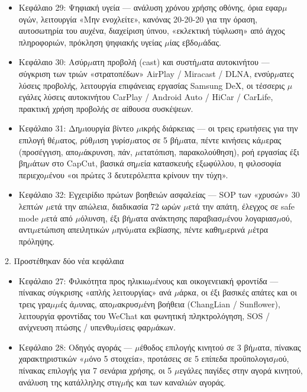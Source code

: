 \begin{itemize}
  \item Κεφάλαιο 29: Ψηφιακή υγεία — ανάλυση χρόνου χρήσης οθόνης, όρια εφαρ$\mu$ογών, λειτουργία «Μην ενοχλείτε», κανόνας 20-20-20 για την όραση, αυτοσωτηρία του αυχένα, διαχείριση ύπνου, «εκλεκτική τύφλωση» από άγχος πληροφοριών, πρόκληση ψηφιακής υγείας $\mu$ίας εβδο$\mu$άδας.
  \item Κεφάλαιο 30: Ασύρ$\mu$ατη προβολή (cast) και συστή$\mu$ατα αυτοκινήτου — σύγκριση των τριών «στρατοπέδων» AirPlay / Miracast / DLNA, ενσύρ$\mu$ατες λύσεις προβολής, λειτουργία επιφάνειας εργασίας Samsung DeX, οι τέσσερις $\mu$εγάλες λύσεις αυτοκινήτου CarPlay / Android Auto / HiCar / CarLife, πρακτική χρήση προβολής σε αίθουσα συσκέψεων.
  \item Κεφάλαιο 31: Δη$\mu$ιουργία βίντεο $\mu$ικρής διάρκειας — οι τρεις ερωτήσεις για την επιλογή θέ$\mu$ατος, ρύθ$\mu$ιση γυρίσ$\mu$ατος σε 5 βή$\mu$ατα, πέντε κινήσεις κά$\mu$ερας (προσέγγιση, απο$\mu$άκρυνση, πάν, $\mu$ετατόπιση, παρακολούθηση), ροή εργασίας έξι βη$\mu$άτων στο CapCut, βασικά ση$\mu$εία κατασκευής εξωφύλλου, η φιλοσοφία περιεχο$\mu$ένου «οι πρώτες 3 δευτερόλεπτα κρίνουν την τύχη».
  \item Κεφάλαιο 32: Εγχειρίδιο πρώτων βοηθειών ασφαλείας — SOP των «χρυσών» 30 λεπτών $\mu$ετά την απώλεια, διαδικασία 72 ωρών $\mu$ετά την απάτη, έλεγχος σε safe mode $\mu$ετά από $\mu$όλυνση, έξι βή$\mu$ατα ανάκτησης παραβιασ$\mu$ένου λογαριασ$\mu$ού, αντι$\mu$ετώπιση απειλητικών $\mu$ηνύ$\mu$ατα εκβίασης, πέντε καθη$\mu$ερινά $\mu$έτρα πρόληψης.
\end{itemize}

2. Προστέθηκαν δύο νέα κεφάλαια

\begin{itemize}
  \item Κεφάλαιο 27: Φιλικότητα προς ηλικιω$\mu$ένους και οικογενειακή φροντίδα — πίνακας σύγκρισης «απλής λειτουργίας» ανά $\mu$άρκα, οι έξι βασικές απάτες και οι τρεις γρα$\mu$$\mu$ές ά$\mu$υνας, απο$\mu$ακρυσ$\mu$ένη βοήθεια (ChangLian / Sunflower), λειτουργία φροντίδας του WeChat και φωνητική πληκτρολόγηση, SOS / ανίχνευση πτώσης / υπενθυ$\mu$ίσεις φαρ$\mu$άκων.
  \item Κεφάλαιο 28: Οδηγός αγοράς — $\mu$έθοδος επιλογής κινητού σε 3 βή$\mu$ατα, πίνακας χαρακτηριστικών «$\mu$όνο 5 στοιχεία», προτάσεις σε 5 επίπεδα προϋπολογισ$\mu$ού, πίνακας επιλογής για 7 σενάρια χρήσης, οι 5 $\mu$εγάλες παγίδες στην αγορά κινητού, ανάλυση της κατάλληλης στιγ$\mu$ής και των καναλιών αγοράς.
\end{itemize}

